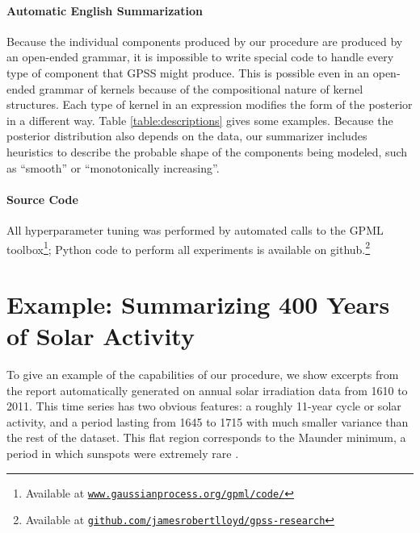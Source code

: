\documentclass{article} %
\begin{document}
\paragraph{Automatic English Summarization}
Because the individual components produced by our procedure are produced by an open-ended grammar, it is impossible to write special code to handle every type of component that GPSS might produce.  %
%
This is possible even in an open-ended grammar of kernels because of the compositional nature of kernel structures.  Each type of kernel in an expression modifies the form of the posterior in a different way.  Table \ref{table:descriptions} gives some examples.
Because the posterior distribution also depends on the data, our summarizer includes heuristics to describe the probable shape of the components being modeled, such as ``smooth'' or ``monotonically increasing''.

\paragraph{Source Code} All \gp{} hyperparameter tuning was performed by automated calls to the GPML toolbox\footnote{Available at 
\href{http://www.gaussianprocess.org/gpml/code/}
{\texttt{www.gaussianprocess.org/gpml/code/}}
}; Python code to perform all experiments is available on github.\footnote{Available at 
\href{http://www.github.com/jamesrobertlloyd/gpss-research}
{\texttt{github.com/jamesrobertlloyd/gpss-research}}
}

\section{Example: Summarizing 400 Years of Solar Activity}
\label{sec:example}

To give an example of the capabilities of our procedure, we show excerpts from the report automatically generated on annual solar irradiation data from 1610 to 2011.  This time series has two obvious features: a roughly 11-year cycle or solar activity, and a period lasting from 1645 to 1715 with much smaller variance than the rest of the dataset.  This flat region corresponds to the Maunder minimum, a period in which sunspots were extremely rare \citep{lean1995reconstruction}.
\end{document}
